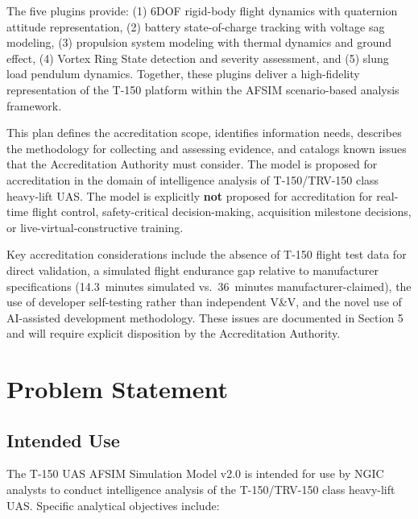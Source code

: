 \documentclass[11pt, letterpaper]{article}
\begin{document}
\unclass The five plugins provide: (1) 6DOF rigid-body flight dynamics with quaternion attitude representation, (2) battery state-of-charge tracking with voltage sag modeling, (3) propulsion system modeling with thermal dynamics and ground effect, (4) Vortex Ring State detection and severity assessment, and (5) slung load pendulum dynamics. Together, these plugins deliver a high-fidelity representation of the T-150 platform within the AFSIM scenario-based analysis framework.

\unclass This plan defines the accreditation scope, identifies information needs, describes the methodology for collecting and assessing evidence, and catalogs known issues that the Accreditation Authority must consider. The model is proposed for accreditation in the domain of intelligence analysis of T-150/TRV-150 class heavy-lift UAS. The model is explicitly \textbf{not} proposed for accreditation for real-time flight control, safety-critical decision-making, acquisition milestone decisions, or live-virtual-constructive training.

\unclass Key accreditation considerations include the absence of T-150 flight test data for direct validation, a simulated flight endurance gap relative to manufacturer specifications (14.3~minutes simulated vs.\ 36~minutes manufacturer-claimed), the use of developer self-testing rather than independent V\&V, and the novel use of AI-assisted development methodology. These issues are documented in Section 5 and will require explicit disposition by the Accreditation Authority.

\pagebreak


\section{\unclass Problem Statement}

\subsection{\unclass Intended Use}

\unclass The T-150 UAS AFSIM Simulation Model v2.0 is intended for use by NGIC analysts to conduct intelligence analysis of the T-150/TRV-150 class heavy-lift UAS. Specific analytical objectives include:
\end{document}
